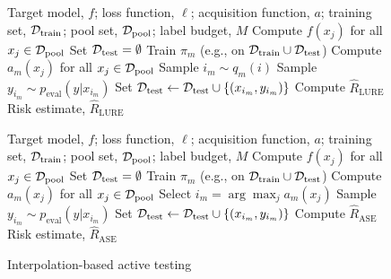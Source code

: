 \begin{figure}[t]
    \centering
    \begin{minipage}[t]{0.47\textwidth}
        \begin{algorithm}[H]
            \caption{Sampling-based active testing}
            \begin{algorithmic}[1]  %
                \INPUT Target model, $f$; loss function, $\ell$; acquisition function, $a$; training set, $\mathcal{D}_\mathrm{train}$; pool set, $\mathcal{D}_\mathrm{pool}$; label budget, $M$
                \STATE Compute $f(x_j)$ for all $x_j \in \mathcal{D}_\mathrm{pool}$
                \STATE Set $\mathcal{D}_\mathrm{test} = \emptyset$
                    \STATE Train $\pi_m$ (e.g., on $\mathcal{D}_\mathrm{train} \cup \mathcal{D}_\mathrm{test}$)
                    \STATE Compute $a_m(x_j)$ for all $x_j \in \mathcal{D}_\mathrm{pool}$
                    \STATE Sample $i_m \sim q_m(i)$
                    \STATE Sample $y_{i_m} \sim p_\mathrm{eval}(y|x_{i_m})$
                    \STATE Set $\mathcal{D}_\mathrm{test} \leftarrow \mathcal{D}_\mathrm{test} \cup \{(x_{i_m},y_{i_m})\}$
                \ENDFOR
                \STATE Compute $\hat{R}_{\mathrm{LURE}}$
                \OUTPUT Risk estimate, $\hat{R}_{\mathrm{LURE}}$
            \end{algorithmic}
            \label{alg:sampling}
        \end{algorithm}
    \end{minipage}
    \hfill
    \begin{minipage}[t]{0.47\textwidth}
        \begin{algorithm}[H]
            \caption{Interpolation-based active testing}
            \begin{algorithmic}[1]  %
                \INPUT Target model, $f$; loss function, $\ell$; acquisition function, $a$; training set, $\mathcal{D}_\mathrm{train}$; pool set, $\mathcal{D}_\mathrm{pool}$; label budget, $M$
                \STATE Compute $f(x_j)$ for all $x_j \in \mathcal{D}_\mathrm{pool}$
                \STATE Set $\mathcal{D}_\mathrm{test} = \emptyset$
                    \STATE Train $\pi_m$ (e.g., on $\mathcal{D}_\mathrm{train} \cup \mathcal{D}_\mathrm{test}$)
                    \STATE Compute $a_m(x_j)$ for all $x_j \in \mathcal{D}_\mathrm{pool}$
                    \STATE Select $i_m = \arg\max_j a_m(x_j)$
                    \STATE Sample $y_{i_m} \sim p_\mathrm{eval}(y|x_{i_m})$
                    \STATE Set $\mathcal{D}_\mathrm{test} \leftarrow \mathcal{D}_\mathrm{test} \cup \{(x_{i_m},y_{i_m})\}$
                \ENDFOR
                \STATE Compute $\hat{R}_{\mathrm{ASE}}$
                \OUTPUT Risk estimate, $\hat{R}_{\mathrm{ASE}}$
            \end{algorithmic}
            \label{alg:interpolation}
        \end{algorithm}
    \end{minipage}
\end{figure}